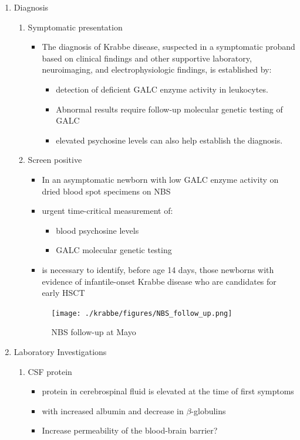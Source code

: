\documentclass{scrartcl}
\begin{document}
\begin{enumerate}
\item Diagnosis
\label{sec:org02dd19b}
\begin{enumerate}
\item Symptomatic presentation
\label{sec:org70a4d60}
\begin{itemize}
\item The diagnosis of Krabbe disease, suspected in a symptomatic proband
based on clinical findings and other supportive laboratory,
neuroimaging, and electrophysiologic findings, is established by:
\begin{itemize}
\item detection of deficient GALC enzyme activity in leukocytes.
\item Abnormal results require follow-up molecular genetic testing of GALC
\item elevated psychosine levels can also help establish the diagnosis.
\end{itemize}
\end{itemize}

\item Screen positive
\label{sec:orgd9fe7ca}
\begin{itemize}
\item In an asymptomatic newborn with low GALC enzyme activity
on dried blood spot specimens on NBS
\item urgent time-critical measurement of:
\begin{itemize}
\item blood psychosine levels
\item GALC molecular genetic testing
\end{itemize}
\item is necessary to identify, before age 14 days, those newborns with
evidence of infantile-onset Krabbe disease who are candidates for
early HSCT
\end{itemize}

\begin{figure}[htbp]
\centering
\texttt{[image: ./krabbe/figures/NBS\_follow\_up.png]}
\caption{\label{fig:orgceaecf0}
NBS follow-up at Mayo}
\end{figure}
\end{enumerate}

\item Laboratory Investigations
\label{sec:org9d89a3e}

\begin{enumerate}
\item CSF protein
\label{sec:org99063ca}
\begin{itemize}
\item protein in cerebrospinal fluid is elevated at the time of first symptoms
\item with increased albumin and decrease in \(\beta\)-globulins
\item Increase permeability of the blood-brain barrier?
\end{itemize}


\end{enumerate}
\end{enumerate}
\end{document}
